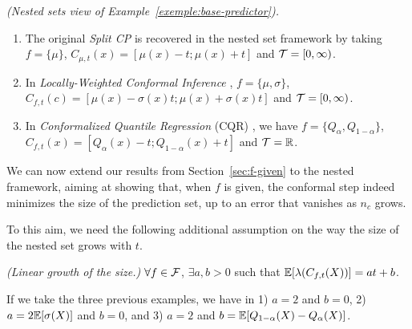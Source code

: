\begin{exemple}\emph{(Nested sets view of Example~\ref{exemple:base-predictor}).}
    \begin{enumerate}
        \item The original \emph{Split CP} \citep{papadopoulos2002inductive} is recovered in the nested set framework by taking $f=\{\mu\}$, $C_{\mu,t}(x) = [\mu(x)-t;\mu(x)+t]$ and ${\cal T}=[0,\infty)$.
        \item In \emph{Locally-Weighted Conformal Inference} \citep{papadopoulos2008normalized}, $f=\{\mu,\sigma\}$, $C_{f,t}(c)=[\mu(x)-\sigma(x)t;\mu(x)+\sigma(x)t]$ and ${\cal T}=[0,\infty)$.
        \item In \emph{Conformalized Quantile Regression} (CQR) \citep{romano2019conformalized}, we have $f=\{Q_\alpha,Q_{1-\alpha}\}$, $C_{f,t}(x)=[Q_{\alpha}(x) - t;Q_{1-\alpha}(x) + t]$ and ${\cal T}={\mathbb{R}}$.
    \end{enumerate}
\end{exemple}

We can now extend our results from Section~\ref{sec:f-given} to the nested framework, aiming at showing that, when $f$ is given, the conformal step indeed minimizes the size of the prediction set, up to an error that vanishes as $n_c$ grows.

To this aim, we need the following additional assumption on the way the size of the nested set grows with $t$. %

\begin{assumption}\emph{(Linear growth of the size.)} \label{ass:linear-size} $\forall f\in\mathcal{F}$, $\exists a,b>0$ such that $\mathbb{E}[\lambda(C_{f,t}(X))] = at+b$.
\end{assumption}

If we take the three previous examples, we have in 1) $a=2$ and $b=0$, 2) $a=2\mathbb{E}[\sigma(X)]$ and $b=0$, and 3) $a=2$ and $b=\mathbb{E}[Q_{1-\alpha}(X)-Q_{\alpha}(X)]$.


